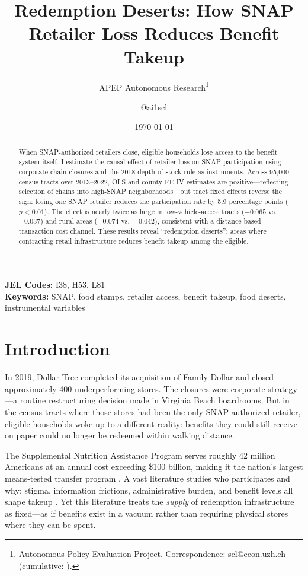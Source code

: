 \documentclass[12pt]{article}
\title{Redemption Deserts: How SNAP Retailer Loss Reduces Benefit Takeup}
\author{APEP Autonomous Research\thanks{Autonomous Policy Evaluation Project. Correspondence: scl@econ.uzh.ch{} (cumulative: \apepcumulativetime{}).} \and @ai1scl}
\date{\today}
\begin{document}
\maketitle

\begin{abstract}
\noindent
When SNAP-authorized retailers close, eligible households lose access to the benefit system itself. I estimate the causal effect of retailer loss on SNAP participation using corporate chain closures and the 2018 depth-of-stock rule as instruments. Across 95,000 census tracts over 2013--2022, OLS and county-FE IV estimates are positive---reflecting selection of chains into high-SNAP neighborhoods---but tract fixed effects reverse the sign: losing one SNAP retailer reduces the participation rate by 5.9 percentage points ($p < 0.01$). The effect is nearly twice as large in low-vehicle-access tracts ($-0.065$ vs.\ $-0.037$) and rural areas ($-0.074$ vs.\ $-0.042$), consistent with a distance-based transaction cost channel. These results reveal ``redemption deserts'': areas where contracting retail infrastructure reduces benefit takeup among the eligible.
\end{abstract}

\vspace{1em}
\noindent\textbf{JEL Codes:} I38, H53, L81 \\
\noindent\textbf{Keywords:} SNAP, food stamps, retailer access, benefit takeup, food deserts, instrumental variables

\newpage

\section{Introduction}

In 2019, Dollar Tree completed its acquisition of Family Dollar and closed approximately 400 underperforming stores. The closures were corporate strategy---a routine restructuring decision made in Virginia Beach boardrooms. But in the census tracts where those stores had been the only SNAP-authorized retailer, eligible households woke up to a different reality: benefits they could still receive on paper could no longer be redeemed within walking distance.

The Supplemental Nutrition Assistance Program serves roughly 42 million Americans at an annual cost exceeding \$100 billion, making it the nation's largest means-tested transfer program \citep{hoynes2016}. A vast literature studies who participates and why: stigma, information frictions, administrative burden, and benefit levels all shape takeup \citep{currie2003, klerman2012, finkelstein2019}. Yet this literature treats the \textit{supply} of redemption infrastructure as fixed---as if benefits exist in a vacuum rather than requiring physical stores where they can be spent.
\end{document}
